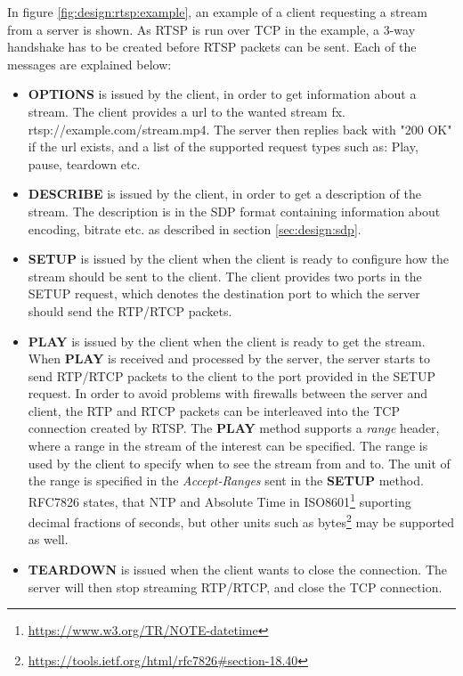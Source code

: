In figure \ref{fig:design:rtsp:example}, an example of a client requesting a stream from a server is shown. As RTSP is run over TCP in the example, a 3-way handshake has to be created before RTSP packets can be sent.
Each of the messages are explained below:
\begin{itemize}
	\item \textbf{OPTIONS} is issued by the client, in order to get information about a stream. The client provides a url to the wanted stream fx. rtsp://example.com/stream.mp4. The server then replies back with "200 OK" if the url exists, and a list of the supported request types such as: Play, pause, teardown etc.
	
	\item \textbf{DESCRIBE} is issued by the client, in order to get a description of the stream. The description is in the SDP format containing information about encoding, bitrate etc. as described in section \ref{sec:design:sdp}.
	
	\item \textbf{SETUP} is issued by the client when the client is ready to configure how the stream should be sent to the client. The client provides two ports in the SETUP request, which denotes the destination port to which the server should send the RTP/RTCP packets.
	
	\item \textbf{PLAY} is issued by the client when the client is ready to get the stream.
When \textbf{PLAY} is received and processed by the server, the server starts to send RTP/RTCP packets to the client to the port provided in the SETUP request.
In order to avoid problems with firewalls between the server and client, the RTP and RTCP packets can be interleaved into the TCP connection created by RTSP.
The \textbf{PLAY} method supports a \textit{range} header, where a range in the stream of the interest can be specified.
The range is used by the client to specify when to see the stream from and to. 
The unit of the range is specified in the \textit{Accept-Ranges} sent in the \textbf{SETUP} method. RFC7826 states, that \ac{NTP} and Absolute Time in ISO8601\footnote{\url{https://www.w3.org/TR/NOTE-datetime}} suporting decimal fractions of seconds, but other units such as bytes\footnote{\url{https://tools.ietf.org/html/rfc7826\#section-18.40}} may be supported as well.
	\item \textbf{TEARDOWN} is issued when the client wants to close the connection. The server will then stop streaming RTP/RTCP, and close the TCP connection.
\end{itemize}

